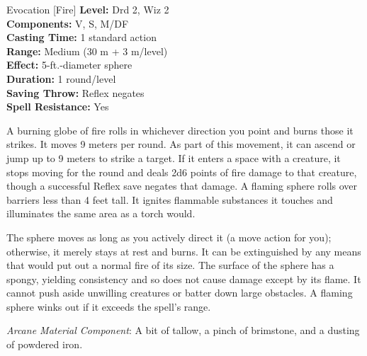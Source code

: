 {Evocation [Fire]}
{
	\textbf{Level:}
	Drd 2, Wiz 2\\
	\textbf{Components:}
	V, S, M/DF\\
	\textbf{Casting Time:}
	1 standard action\\
	\textbf{Range:}
	Medium (30 m + 3 m/level)\\
	\textbf{Effect:}
	5-ft.-diameter sphere\\
	\textbf{Duration:}
	1 round/level\\
	\textbf{Saving Throw:}
	Reflex negates\\
	\textbf{Spell Resistance:}
	Yes\\
}
{
	A burning globe of fire rolls in whichever direction you point and burns those it strikes. It moves 9 meters per round. As part of this movement, it can ascend or jump up to 9 meters to strike a target. If it enters a space with a creature, it stops moving for the round and deals 2d6 points of fire damage to that creature, though a successful Reflex save negates that damage. A flaming sphere rolls over barriers less than 4 feet tall. It ignites flammable substances it touches and illuminates the same area as a torch would.

	The sphere moves as long as you actively direct it (a move action for you); otherwise, it merely stays at rest and burns. It can be extinguished by any means that would put out a normal fire of its size. The surface of the sphere has a spongy, yielding consistency and so does not cause damage except by its flame. It cannot push aside unwilling creatures or batter down large obstacles. A flaming sphere winks out if it exceeds the spell's range.

	\textit{Arcane Material Component}:
	A bit of tallow, a pinch of brimstone, and a dusting of powdered iron.

}
